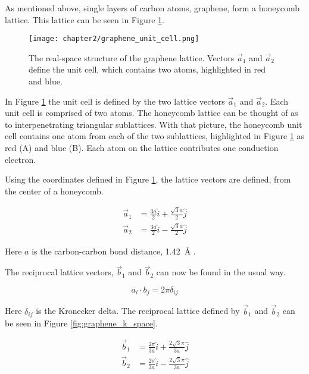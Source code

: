As mentioned above, single layers of carbon atoms, graphene, form a honeycomb lattice. This lattice can be seen in Figure \ref{fig:graphene_unit_cell}.

\begin{figure}
    \centering
    \texttt{[image: chapter2/graphene\_unit\_cell.png]}
    \caption{The real-space structure of the graphene lattice. Vectors $\vec{a}_1$ and $\vec{a}_2$ define the unit cell, which contains two atoms, highlighted in red and blue.}
    \label{fig:graphene_unit_cell}
\end{figure}

In Figure \ref{fig:graphene_unit_cell} the unit cell is defined by the two lattice vectors $\vec{a}_1$ and $\vec{a}_2$. Each unit cell is comprised of two atoms. The honeycomb lattice can be thought of as to interpenetrating triangular sublattices. With that picture, the honeycomb unit cell contains one atom from each of the two sublattices, highlighted in Figure \ref{fig:graphene_unit_cell} as red (A) and blue (B). Each atom on the lattice contributes one conduction electron.

Using the coordinates defined in Figure \ref{fig:graphene_unit_cell}, the lattice vectors are defined, from the center of a honeycomb.

\begin{align}
    \vec{a}_1 &= \frac{3a}{2}\hat{i} + \frac{\sqrt{3}a}{2}\hat{j} \\
    \vec{a}_2 &= \frac{3a}{2}\hat{i} - \frac{\sqrt{3}a}{2}\hat{j}
\end{align}

Here $a$ is the carbon-carbon bond distance, \SI{1.42}{\angstrom} \cite{Javey2009}.

The reciprocal lattice vectors, $\vec{b}_1$ and $\vec{b}_2$ can now be found in the usual way.

\begin{equation}
    a_i \cdot b_j = 2\pi \delta_{ij}
\end{equation}

Here $\delta_{ij}$ is the Kronecker delta. The reciprocal lattice defined by $\vec{b}_1$ and $\vec{b}_2$ can be seen in Figure \ref{fig:graphene_k_space}.

\begin{align}
    \vec{b}_1 &= \frac{2\pi}{3a}\hat{i} + \frac{2\sqrt{3}\pi}{3a}\hat{j} \\
    \vec{b}_2 &= \frac{2\pi}{3a}\hat{i} - \frac{2\sqrt{3}\pi}{3a}\hat{j}
\end{align}

